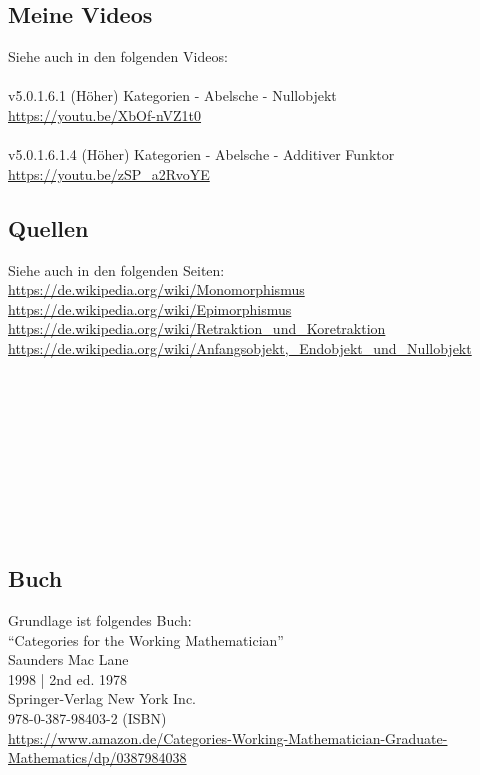 \documentclass[a4paper]{amsart}
\theoremstyle{definition}
\begin{document}
\subsection*{Meine Videos}
Siehe auch in den folgenden Videos:\\ 
\\
v5.0.1.6.1 (Höher) Kategorien - Abelsche - Nullobjekt\\
\url{https://youtu.be/XbOf-nVZ1t0}\\
\\
v5.0.1.6.1.4 (Höher) Kategorien - Abelsche - Additiver Funktor\\
\url{https://youtu.be/zSP_a2RvoYE}

\subsection*{Quellen}
Siehe auch in den folgenden Seiten:\\
\url{https://de.wikipedia.org/wiki/Monomorphismus}\\
\url{https://de.wikipedia.org/wiki/Epimorphismus}\\
\url{https://de.wikipedia.org/wiki/Retraktion_und_Koretraktion}\\
\url{https://de.wikipedia.org/wiki/Anfangsobjekt,_Endobjekt_und_Nullobjekt}\\
\url{}\\
\url{}\\
\url{}\\
\url{}\\
\url{}\\
\url{}\\
\url{}\\
\url{}\\
\url{}\\


\subsection*{Buch}
Grundlage ist folgendes Buch:\\
"`Categories for the Working Mathematician"'\\
Saunders Mac Lane\\
1998 | 2nd ed. 1978\\
Springer-Verlag New York Inc.\\
978-0-387-98403-2 (ISBN)\\
{\tiny
   \url{https://www.amazon.de/Categories-Working-Mathematician-Graduate-Mathematics/dp/0387984038}}\\
\end{document}
